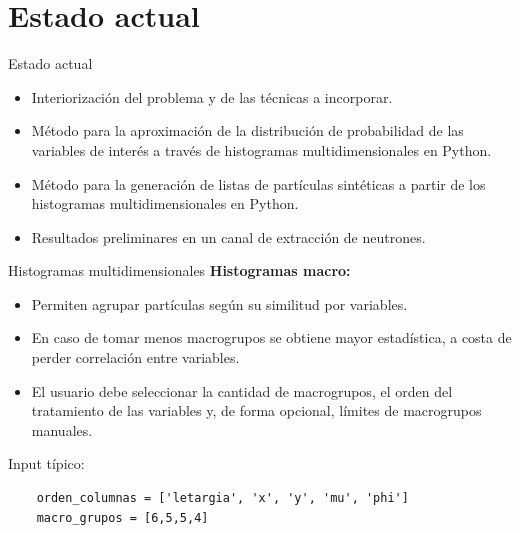 \documentclass[aspectratio=169,english]{beamer}
\begin{document}
\section{Estado actual}
\begin{frame}{Estado actual}
    \begin{itemize}
        \item Interiorización del problema y de las técnicas a incorporar.
        \item Método para la aproximación de la distribución de probabilidad de las variables de interés a través de histogramas multidimensionales en Python. 
        \item Método para la generación de listas de partículas sintéticas a partir de los histogramas multidimensionales en Python. 
        \item Resultados preliminares en un canal de extracción de neutrones.
    \end{itemize}

\end{frame}

\begin{frame}[fragile]{Histogramas multidimensionales}
    \textbf{Histogramas macro:}
    \begin{itemize}
        \item Permiten agrupar partículas según su similitud por variables.
        \item En caso de tomar menos macrogrupos se obtiene mayor estadística, a costa de perder correlación entre variables.
        \item El usuario debe seleccionar la cantidad de macrogrupos, el orden del tratamiento de las variables y, de forma opcional, límites de macrogrupos manuales. 
    \end{itemize} 

    Input típico:

    \begin{verbatim}
    orden_columnas = ['letargia', 'x', 'y', 'mu', 'phi']
    macro_grupos = [6,5,5,4]
    \end{verbatim}

\end{frame}
\end{document}

